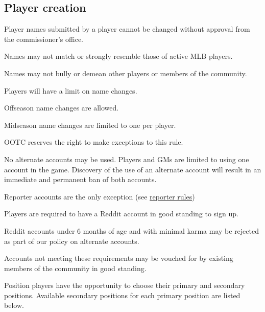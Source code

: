 \subsection{Player creation}
\begin{deepEnumerate}
	\item Player names submitted by a player cannot be changed without approval from the commissioner's office.
	\begin{deepEnumerate}
		\item Names may not match or strongly resemble those of active MLB players.
		\item Names may not bully or demean other players or members of the community.
		\item Players will have a limit on name changes.
		\begin{deepEnumerate}
			\item Offseason name changes are allowed.
			\item Midseason name changes are limited to one per player.
			\item OOTC reserves the right to make exceptions to this rule.
		\end{deepEnumerate}
		\item No alternate accounts may be used. Players and GMs are limited to using one account in the game.
		Discovery of the use of an alternate account will result in an immediate and permanent ban of both accounts.
		\begin{deepEnumerate}
			\item Reporter accounts are the only exception (see \hyperref[sec:reporters]{reporter rules})
		\end{deepEnumerate}
	\end{deepEnumerate}
	\item Players are required to have a Reddit account in good standing to sign up.
	\begin{deepEnumerate}
		\item Reddit accounts under 6 months of age and with minimal karma may be rejected as part of our policy on alternate accounts.
		\begin{deepEnumerate}
			\item Accounts not meeting these requirements may be vouched for by existing members of the community in good standing.
		\end{deepEnumerate}
	\end{deepEnumerate}
	\item Position players have the opportunity to choose their primary and secondary positions.
	Available secondary positions for each primary position are listed below.
	

\end{deepEnumerate}
